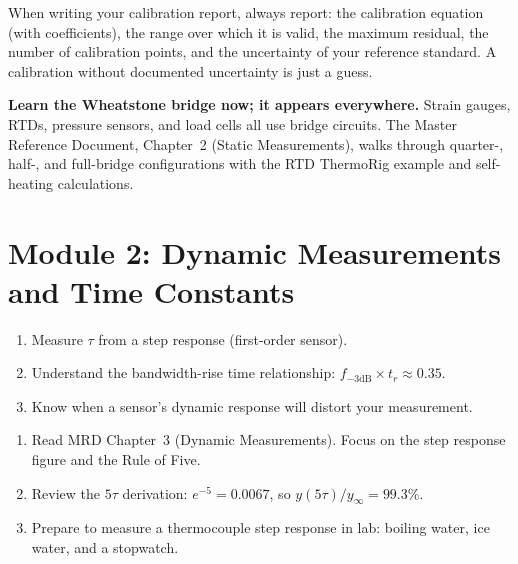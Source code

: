 \documentclass[11pt,letterpaper]{article}
\begin{document}
\begin{tipbox}
When writing your calibration report, always report: the calibration equation (with coefficients), the range over which it is valid, the maximum residual, the number of calibration points, and the uncertainty of your reference standard. A calibration without documented uncertainty is just a guess.
\end{tipbox}

\begin{protip}
\textbf{Learn the Wheatstone bridge now; it appears everywhere.} Strain gauges, RTDs, pressure sensors, and load cells all use bridge circuits. The Master Reference Document, Chapter~2 (Static Measurements), walks through quarter-, half-, and full-bridge configurations with the RTD ThermoRig example and self-heating calculations.
\end{protip}

\section{Module 2: Dynamic Measurements and Time Constants}

\begin{priorities}
\begin{enumerate}[leftmargin=*, itemsep=1pt, topsep=0pt]
    \item Measure $\tau$ from a step response (first-order sensor).
    \item Understand the bandwidth-rise time relationship: $f_{-3\text{dB}} \times t_r \approx 0.35$.
    \item Know when a sensor's dynamic response will distort your measurement.
\end{enumerate}
\end{priorities}

\begin{tcolorbox}[colback=minesblue!3, colframe=minesblue!40, boxrule=0.5pt, arc=2pt, left=6pt, right=6pt, top=3pt, bottom=3pt, fonttitle=\small\bfseries\color{minesblue}, title={Before You Start: Module 2}]
\small
\begin{enumerate}[nosep,leftmargin=*]
\item Read MRD Chapter~3 (Dynamic Measurements). Focus on the step response figure and the Rule of Five.
\item Review the $5\tau$ derivation: $e^{-5} = 0.0067$, so $y(5\tau)/y_\infty = 99.3\%$.
\item Prepare to measure a thermocouple step response in lab: boiling water, ice water, and a stopwatch.
\end{enumerate}
\end{tcolorbox}
\end{document}
